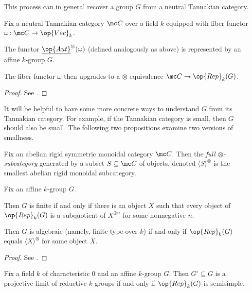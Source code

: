 \documentclass{article}
\begin{document}
This process can in general recover a group $G$ from a neutral Tannakian category.
\begin{theorem}
	Fix a neutral Tannakian category $\mc C$ over a field $k$ equipped with fiber functor $\omega\colon\mc C\to\op{Vec}_k$.
	\begin{listalph}
		\item The functor $\underline{\op{Aut}}^\otimes(\omega)$ (defined analogously as above) is represented by an affine $k$-group $G$.
		\item The fiber functor $\omega$ then upgrades to a $\otimes$-equivalence $\mc C\to\op{Rep}_k(G)$.
	\end{listalph}
\end{theorem}
\begin{proof}
	See \cite[Theorem~2.11]{milne-tannakian}.
\end{proof}
It will be helpful to have some more concrete ways to understand $G$ from its Tannakian category. For example, if the Tannakian category is small, then $G$ should also be small. The following two propositions examine two versions of smallness.
\begin{definition}
	Fix an abelian rigid symmetric monoidal category $\mc C$. Then the \textit{full $\otimes$-subcat\-egory} generated by a subset $S\subseteq\mc C$ of objects, denoted $\langle S\rangle^{\otimes}$ is the smallest abelian rigid monoidal subcategory.
\end{definition}
\begin{proposition}
	Fix an affine $k$-group $G$.
	\begin{listalph}
		\item Then $G$ is finite if and only if there is an object $X$ such that every object of $\op{Rep}_k(G)$ is a subquotient of $X^{\oplus n}$ for some nonnegative $n$.
		\item Then $G$ is algebraic (namely, finite type over $k$) if and only if $\op{Rep}_k(G)$ equals $\langle X\rangle^{\otimes}$ for some object $X$.
	\end{listalph}
\end{proposition}
\begin{proof}
	See \cite[Proposition~2.20]{milne-tannakian}.
\end{proof}
\begin{proposition}
	Fix a field $k$ of characteristic $0$ and an affine $k$-group $G$. Then $G^\circ\subseteq G$ is a projective limit of reductive $k$-groups if and only if $\op{Rep}_k(G)$ is semisimple.
\end{proposition}
\end{document}
